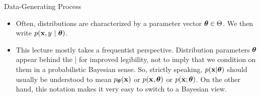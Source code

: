 \documentclass[11pt,compress,t,notes=noshow, xcolor=table]{beamer}
\begin{document}
\begin{vbframe}{Data-Generating Process}
\begin{itemize}
  \item Often, distributions are characterized by a parameter vector 
  $\bm{\theta} \in \Theta$. We then write $p(\mathbf{x}, y ~|~ \bm{\theta})$.
  
  \item This lecture mostly takes a frequentist perspective. Distribution 
  parameters $\bm{\theta}$ appear behind the | for improved legibility, not to imply 
  that we condition on them in a probabilistic Bayesian sense.
  So, strictly speaking, $p(\mathbf{x} | \bm{\theta})$ should usually be understood to mean 
  $p_{\bm{\theta}}(\mathbf{x})$ or $p(\mathbf{x}, \bm{\theta})$ or $p(\mathbf{x}; \bm{\theta})$.
  On the other hand, this notation makes it very easy to switch to a Bayesian view.

\end{itemize}

\end{vbframe}


\endlecture
\end{document}
